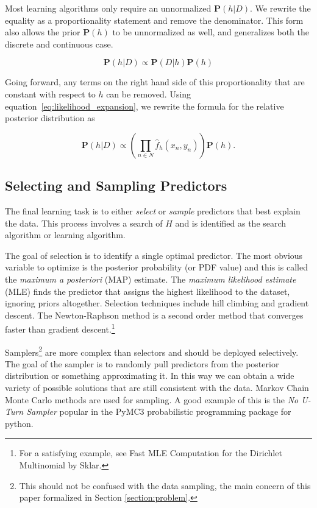 \documentclass[twoside]{article}
\begin{document}
Most learning algorithms only require an unnormalized \(\mathbf{P}(h|D)\). We rewrite the equality as a proportionality statement and remove the denominator. This form also allows the prior \(\mathbf{P}(h)\) to be unnormalized as well, and generalizes both the discrete and continuous case.

\begin{equation}
\label{eq:bayes}
\mathbf{P}(h|D)\propto\mathbf{P}(D|h)\mathbf{P}(h)
\end{equation}

Going forward, any terms on the right hand side of this proportionality that are constant with respect to \(h\) can be removed. Using equation~\eqref{eq:likelihood_expansion}, we rewrite the formula for the relative posterior distribution as

\begin{equation}
\label{eq:bayes_likelihood_expanded}
\mathbf{P}(h|D)\propto \left( \prod_{n \in N} \hat{f}_h(x_n,y_n) \right) \mathbf{P}(h).
\end{equation}

\subsection{Selecting and Sampling Predictors}

The final learning task is to either \textit{select} or \textit{sample} predictors that best explain the data. This process involves a search of \(H\) and is identified as the search algorithm or learning algorithm.

The goal of selection is to identify a single optimal predictor. The most obvious variable to optimize is the posterior probability (or PDF value) and this is called the \textit{maximum a posteriori} (MAP) estimate. The \textit{maximum likelihood estimate} (MLE) finds the predictor that assigns the highest likelihood to the dataset, ignoring priors altogether. Selection techniques include hill climbing and gradient descent. The Newton-Raphson method is a second order method that converges faster than gradient descent.\footnote{For a satisfying example, see Fast MLE Computation for the Dirichlet Multinomial by Sklar\cite{sklar_dirichlet}.}

Samplers\footnote{This should not be confused with the data sampling, the main concern of this paper formalized in Section \ref{section:problem}.} are more complex than selectors and should be deployed selectively. The goal of the sampler is to randomly pull predictors from the posterior distribution or something approximating it. In this way we can obtain a wide variety of possible solutions that are still consistent with the data. Markov Chain Monte Carlo methods are used for sampling. A good example of this is the \textit{No U-Turn Sampler}\cite{gelman} popular in the PyMC3\cite{pymc3} probabilistic programming package for python.
\end{document}
